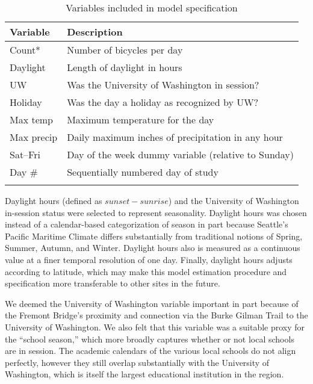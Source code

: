 \documentclass[12pt,letterpaper,article,twocolumn]{memoir}
\begin{document}
\begin{centering}
\begin{table}[h]
\begin{scriptsize}
\caption{Variables included in model specification}
\begin{tabularx}{0.5\textwidth}{>{\raggedright\arraybackslash}p{1.6cm}>{\raggedright\arraybackslash}X}
\toprule
Variable & Description \\
\midrule
Count* & Number of bicycles per day \\
Daylight  & Length of daylight in hours \\
UW & Was the University of Washington in session? \\
Holiday & Was the day a holiday as recognized by UW? \\
Max temp & Maximum temperature for the day \\
Max precip & Daily maximum inches of precipitation in any hour \\
Sat--Fri & Day of the week dummy variable (relative to Sunday) \\
Day \# & Sequentially numbered day of study \\
\bottomrule
\multicolumn{2}{r}{* Dependent variable}
\end{tabularx}

\label{tb:variables}
\end{scriptsize}
\end{table}
\end{centering}

Daylight hours (defined as $sunset - sunrise$) and the University of
Washington in-session status were selected to represent seasonality.
Daylight hours was chosen instead of a calendar-based categorization
of season in part because Seattle's Pacific Maritime Climate differs
substantially from traditional notions of Spring, Summer, Autumn, and
Winter. Daylight hours also is measured as a continuous value at a
finer temporal resolution of one day. Finally, daylight hours adjusts
according to latitude, which may make this model estimation procedure
and specification more transferable to other sites in the future.

We deemed the University of Washington variable important in part
because of the Fremont Bridge's proximity and connection via the Burke
Gilman Trail to the University of Washington. We also felt that this
variable was a suitable proxy for the ``school season,'' which more
broadly captures whether or not local schools are in session. The
academic calendars of the various local schools do not align
perfectly, however they still overlap substantially with the
University of Washington, which is itself the largest educational
institution in the region.
\end{document}
